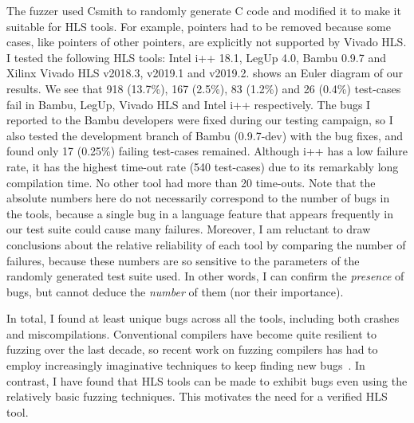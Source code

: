 The fuzzer used Csmith to randomly generate C code and modified it to make it
suitable for HLS tools.  For example, pointers had to be removed because some
cases, like pointers of other pointers, are explicitly not supported by Vivado
HLS.  I tested the following \gls{HLS} tools: Intel i++ 18.1, LegUp 4.0, Bambu
0.9.7 and Xilinx Vivado HLS v2018.3, v2019.1 and v2019.2.
 shows an Euler diagram of our results.  We see that
918 (13.7\%), 167 (2.5\%), 83 (1.2\%) and 26 (0.4\%) test-cases fail in Bambu,
LegUp, Vivado HLS and Intel i++ respectively.  The bugs I reported to the Bambu
developers were fixed during our testing campaign, so I also tested the
development branch of Bambu (0.9.7-dev) with the bug fixes, and found only 17
(0.25\%) failing test-cases remained.  Although i++ has a low failure rate, it
has the highest time-out rate (540 test-cases) due to its remarkably long
compilation time. No other tool had more than 20 time-outs.  Note that the
absolute numbers here do not necessarily correspond to the number of bugs in the
tools, because a single bug in a language feature that appears frequently in our
test suite could cause many failures.  Moreover, I am reluctant to draw
conclusions about the relative reliability of each tool by comparing the number
of failures, because these numbers are so sensitive to the parameters of the
randomly generated test suite used. In other words, I can confirm the
\emph{presence} of bugs, but cannot deduce the \emph{number} of them (nor their
importance).

In total, I found at least \numuniquebugs{} unique bugs across all the tools,
including both crashes and miscompilations.  Conventional compilers have become
quite resilient to fuzzing over the last decade, so recent work on fuzzing
compilers has had to employ increasingly imaginative techniques to keep finding
new bugs~\cite{even-mendoza20_ce}.  In contrast, I have found that HLS tools can
be made to exhibit bugs even using the relatively basic fuzzing techniques.
This motivates the need for a verified \gls{HLS} tool.

